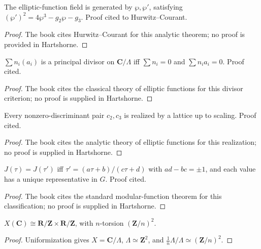 \begin{theorem}\label{ha-ch4-t412b}
The elliptic-function field is generated by \(\wp,\wp'\), satisfying
\((\wp')^2=4\wp^3-g_2\wp-g_3\).  Proof cited to Hurwitz--Courant.
\end{theorem}
\begin{proof}
The book cites Hurwitz--Courant for this analytic theorem; no proof is
provided in Hartshorne.
\end{proof}
\begin{theorem}\label{ha-ch4-t413b}
\(\sum n_i(a_i)\) is a principal divisor on \(\mathbf C/\Lambda\) iff
\(\sum n_i=0\) and \(\sum n_i a_i=0\). Proof cited.
\end{theorem}
\begin{proof}
The book cites the classical theory of elliptic functions for this divisor
criterion; no proof is supplied in Hartshorne.
\end{proof}
\begin{theorem}\label{ha-ch4-t414b}
Every nonzero-discriminant pair \(c_2,c_3\) is realized by a lattice up to
scaling. Proof cited.
\end{theorem}
\begin{proof}
The book cites the analytic theory of elliptic functions for this realization;
no proof is supplied in Hartshorne.
\end{proof}
\begin{theorem}\label{ha-ch4-t415b}
\(J(\tau)=J(\tau')\) iff \(\tau'=(a\tau+b)/(c\tau+d)\) with
\(ad-bc=\pm1\), and each value has a unique representative in \(G\). Proof
cited.
\end{theorem}
\begin{proof}
The book cites the standard modular-function theorem for this classification;
no proof is supplied in Hartshorne.
\end{proof}
\begin{theorem}\label{ha-ch4-t416}
\(X(\mathbf C)\cong\mathbf R/\mathbf Z\times\mathbf R/\mathbf Z\), with
\(n\)-torsion \((\mathbf Z/n)^2\).
\end{theorem}
\begin{proof}Uniformization gives \(X=\mathbf C/\Lambda\), \(\Lambda\simeq\mathbf Z^2\),
and \(\frac1n\Lambda/\Lambda\simeq(\mathbf Z/n)^2\).\end{proof}
